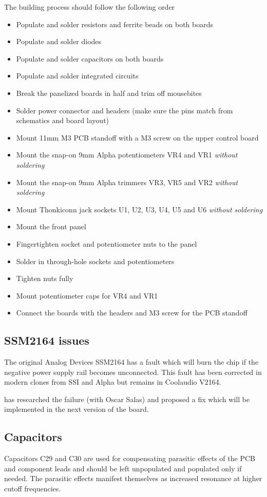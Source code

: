 \documentclass{article}
\begin{document}
The building process should follow the following order

\begin{itemize}
\item Populate and solder resistors and ferrite beads on both boards
\item Populate and solder diodes
\item Populate and solder capacitors on both boards
\item Populate and solder integrated circuits
\item Break the panelized boards in half and trim off mousebites
\item Solder power connector and headers (make sure the pins match from schematics and board layout)
\item Mount 11mm M3 PCB standoff with a M3 screw on the upper control board
\item Mount the snap-on 9mm Alpha potentiometers VR4 and VR1 \emph{without soldering}
\item Mount the snap-on 9mm Alpha trimmers VR3, VR5 and VR2 \emph{without soldering}
\item Mount Thonkiconn jack sockets U1, U2, U3, U4, U5 and U6 \emph{without soldering}
\item Mount the front panel
\item Fingertighten socket and potentiometer nuts to the panel
\item Solder in through-hole sockets and potentiometers
\item Tighten nuts fully
\item Mount potentiometer caps for VR4 and VR1
\item Connect the boards with the headers and M3 screw for the PCB standoff
\end{itemize}

\subsection{SSM2164 issues}
The original Analog Devices SSM2164 has a fault which will burn the chip if the negative power supply rail becomes unconnected. This fault has been corrected in modern clones from SSI and Alpha but remains in Coolaudio V2164.\newline

\cite{johnson} has researched the failure (with Oscar Salas) and proposed a fix which will be implemented in the next version of the board.

\subsection{Capacitors}
Capacitors C29 and C30 are used for compensating parasitic effects of the PCB and component leads and should be left unpopulated and populated only if needed. The parasitic effects manifest themselves as increased resonance at higher cutoff frequencies.
\end{document}

